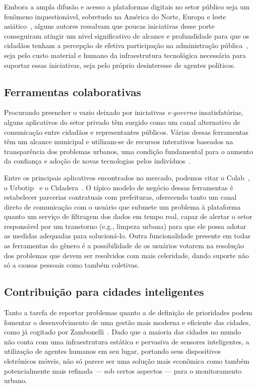 \documentclass{sigchi}
\begin{document}
Embora a ampla difusão e acesso a plataformas digitais no setor público seja um fenômeno inquestionável, sobretudo na América do Norte, Europa e leste asiático~\cite{nam:2011}, alguns autores ressalvam que poucas iniciativas desse porte conseguiram atingir um nível significativo de alcance e profundidade para que os cidadãos tenham a percepção de efetiva participação na administração pública~\cite{layne:2001}, seja pelo custo material e humano da infraestrutura tecnológica necessária para suportar essas iniciativas, seja pelo próprio desinteresse de agentes políticos.

\subsection{Ferramentas colaborativas}
Procurando preencher o vazio deixado por iniciativas \textit{e-governo} insatisfatórias, alguns aplicativos do setor privado têm surgido como um canal alternativo de comunicação entre cidadãos e representantes públicos. Várias dessas ferramentas têm um alcance municipal e utilizam-se de recursos interativos baseados na transparência dos problemas urbanos, uma condição fundamental para o aumento da confiança e adoção de novas tecnologias pelos indivíduos~\cite{carter:2005}.

Entre os principais aplicativos encontrados no mercado, podemos citar o Colab~\cite{colab:2016}, o Urbotip~\cite{urbotip:2016} e o Cidadera~\cite{cidadera:2016}. O típico modelo de negócio dessas ferramentas é estabelecer parcerias contratuais com prefeituras, oferecendo tanto um canal direto de comunicação com o usuário que submete um problema à plataforma quanto um serviço de filtragem dos dados em tempo real, capaz de alertar o setor responsável por um transtorno (e.g., limpeza urbana) para que ele possa adotar as medidas adequadas para solucioná-lo. Outra funcionalidade presente em todas as ferramentas do gênero é a possibilidade de os usuários votarem na resolução dos problemas que devem ser resolvidos com mais celeridade, dando suporte não só a causas pessoais como também coletivas. 

\subsection{Contribuição para cidades inteligentes}
Tanto a tarefa de reportar problemas quanto a de definição de prioridades podem fomentar o desenvolvimento de uma gestão mais moderna e eficiente das cidades, como já cogitado por Zambonelli~\cite{zambonelli:2011}. Dado que a maioria das cidades no mundo não conta com uma infraestrutura estática e pervasiva de sensores inteligentes, a utilização de agentes humanos em seu lugar, portando seus dispositivos eletrônicos móveis, não só parece ser uma solução mais econômica como também potencialmente mais refinada --- sob certos aspectos --- para o monitoramento urbano. 
\end{document}
